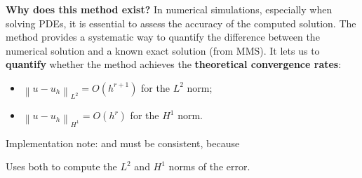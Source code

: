\begin{itemize}
    \textcolor{Green3}{ \textbf{Why does this method exist?}} In numerical simulations, especially when solving PDEs, it is essential to assess the accuracy of the computed solution. The  method provides a systematic way to quantify the difference between the numerical solution and a known exact solution (from MMS). It lets us to \textbf{quantify} whether the method achieves the \textbf{theoretical convergence rates}:
    \begin{itemize}
        \item $\left\|u - u_h\right\|_{L^2} = O\left(h^{r+1}\right)$ for the $L^2$ norm;
        \item $\left\|u - u_h\right\|_{H^1} = O\left(h^{r}\right)$ for the $H^1$ norm.
    \end{itemize}
    Implementation note:  and  must be consistent, because
    \begin{center}
    \end{center}
    Uses both to compute the $L^2$ and $H^1$ norms of the error.
\end{itemize}

\newpage

